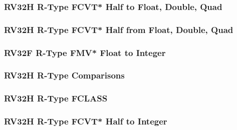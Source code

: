 \subsubsection[{\small RV32H R-Type FCVT* Half to Float, Double, Quad}]{RV32H R-Type FCVT* Half to Float, Double, Quad} \label{sec:format-RV32H-RTypeFCVTT}



\subsubsection[{\small RV32H R-Type FCVT* Half from Float, Double, Quad}]{RV32H R-Type FCVT* Half from Float, Double, Quad} \label{sec:format-RV32H-RTypeFCVTF}



\subsubsection[{\small RV32F R-Type FMV* Float to Integer}]{RV32F R-Type FMV* Float to Integer} \label{sec:format-RV32H-RTypeFMF2I}



\subsubsection[{\small RV32H R-Type Comparisons}]{RV32H R-Type Comparisons} \label{sec:format-RV32H-RTypeFCMP}



\subsubsection[{\small RV32H R-Type FCLASS}]{RV32H R-Type FCLASS} \label{sec:format-RV32H-RTypeFD2I}



\subsubsection[{\small RV32H R-Type FCVT* Half to Integer}]{RV32H R-Type FCVT* Half to Integer} \label{sec:format-RV32H-RTypeFCD2I}



